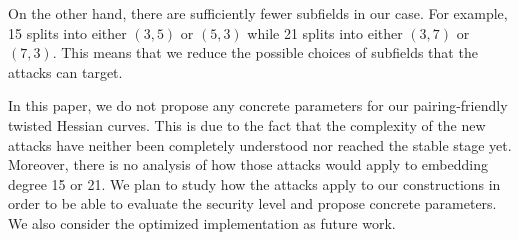 On the other hand, there are sufficiently fewer subfields in our case.
For example, 15 splits into either $(3,5)$ or $(5,3)$
while 21 splits into either $(3,7)$ or $(7,3)$.
This means that we reduce the possible choices of subfields that the attacks can target.

In this paper, we do not propose any concrete parameters for our pairing-friendly twisted Hessian curves.
This is due to the fact that the complexity of the new attacks have neither been completely understood nor reached the stable stage yet.
Moreover, there is no analysis of how those attacks would apply to embedding degree 15 or 21.
We plan to study how the attacks apply to our constructions in order to be able to
evaluate the security level and propose concrete parameters.
We also consider the optimized implementation as future work.
